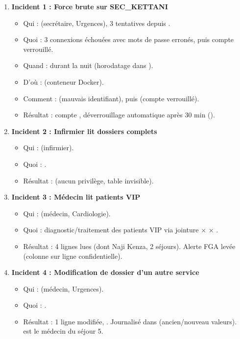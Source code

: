 \begin{enumerate}
\item \textbf{Incident 1 : Force brute sur SEC\_KETTANI}
  \begin{itemize}
    \item Qui :  (secrétaire, Urgences), 3 tentatives depuis .
    \item Quoi : 3 connexions échouées avec mots de passe erronés, puis compte verrouillé.
    \item Quand : durant la nuit (horodatage dans ).
    \item D'où :  (conteneur Docker).
    \item Comment :  (mauvais identifiant), puis  (compte verrouillé).
    \item Résultat : compte , déverrouillage automatique après 30 min ().
  \end{itemize}

\item \textbf{Incident 2 : Infirmier lit dossiers complets}
  \begin{itemize}
    \item Qui :  (infirmier).
    \item Quoi : .
    \item Résultat :  (aucun privilège, table invisible).
  \end{itemize}

\item \textbf{Incident 3 : Médecin lit patients VIP}
  \begin{itemize}
    \item Qui :  (médecin, Cardiologie).
    \item Quoi :  diagnostic/traitement des patients VIP via jointure  ×  × .
    \item Résultat : 4 lignes lues (dont Naji Kenza, 2 séjours). Alerte FGA levée (colonne  sur ligne confidentielle).
  \end{itemize}

\item \textbf{Incident 4 : Modification de dossier d'un autre service}
  \begin{itemize}
    \item Qui :  (médecin, Urgences).
    \item Quoi : .
    \item Résultat : 1 ligne modifiée, . Journalisé dans  (ancien/nouveau valeurs).  est le médecin du séjour 5.
  \end{itemize}


\end{enumerate}
